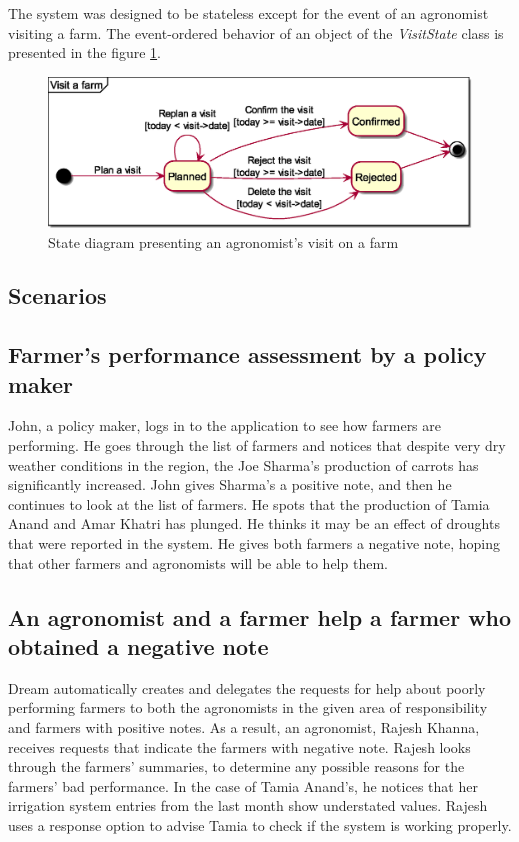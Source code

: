 The system was designed to be stateless except for the event of an agronomist visiting a farm. The event-ordered behavior of an object of the \textit{VisitState} class is presented in the figure \ref{fig:state_diagram}.

\begin{figure}[H]
    \centering
    \includegraphics[width=\textwidth, keepaspectratio, origin=c]{diagrams/state}
    \caption{State diagram presenting an agronomist's visit on a farm}
    \label{fig:state_diagram}
\end{figure}


\subsection{Scenarios}
\subsection*{Farmer's performance assessment by a policy maker}
John, a policy maker, logs in to the application to see how farmers are performing. He goes through the list of farmers and notices that despite very dry weather conditions in the region, the Joe Sharma's production of carrots has significantly increased. John gives Sharma's a positive note, and then he continues to look at the list of farmers. He spots that the production of Tamia Anand and Amar Khatri has plunged. He thinks it may be an effect of droughts that were reported in the system. He gives both farmers a negative note, hoping that other farmers and agronomists will be able to help them. 

\subsection*{An agronomist and a farmer help a farmer who obtained a negative note}
Dream automatically creates and delegates the requests for help about poorly performing farmers to both the agronomists in the given area of responsibility and farmers with positive notes. As a result, an agronomist, Rajesh Khanna, receives requests that indicate the farmers with negative note. Rajesh looks through the farmers' summaries, to determine any possible reasons for the farmers' bad performance. In the case of Tamia Anand's, he notices that her irrigation system entries from the last month show understated values. Rajesh uses a response option to advise Tamia to check if the system is working properly. 

